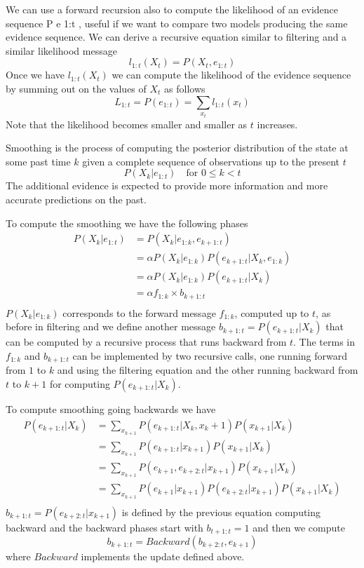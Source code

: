 We can use a forward recursion also to compute the likelihood of an evidence sequence
P e 1:t , useful if we want to compare two models producing the same evidence sequence.\newline
We can derive a recursive equation similar to filtering and a similar likelihood message
\[ l_{1:t}(X_t) = P(X_t, e_{1:t}) \]
Once we have $l_{1:t}(X_t)$ we can compute the likelihood of the evidence sequence by
summing out on the values of $X_t$ as follows
\[ L_{1:t} = P(e_{1:t}) = \sum _{x_t} l_{1:t}(x_t) \]
Note that the likelihood becomes smaller and smaller as $t$ increases.

Smoothing is the process of computing the posterior distribution of the state at some
past time $k$ given a complete sequence of observations up to the present $t$
\[ P(X_k | e_{1:t}) \quad \text{for } 0 \leq k < t \]
The additional evidence is expected to provide more information and more accurate
predictions on the past.

To compute the smoothing we have the following phases
\begin{align*}
   P(X_k | e_{1:t}) & = P(X_k | e_{1:k}, e_{k+1:t}) \\
	            & = \alpha P(X_k | e_{1:k}) P(e_{k+1:t} | X_k, e_{1:k}) \\
		    & = \alpha P(X_k | e_{1:k}) P(e_{k+1:t} | X_k) \\
		    & = \alpha f_{1:k} \times b_{k+1:t} \\
\end{align*}
$P(X_k|e_{1:k})$ corresponds to the forward message $f_{1:k}$, computed up to $t$,
as before in filtering and we define another message $b_{k+1:t} = P(e_{k+1:t}|X_k)$ 
that can be computed by a recursive process that runs backward from $t$.\newline
The terms in $f_{1:k}$ and $b_{k+1:t}$ can be implemented by two recursive calls,
one running forward from $1$ to $k$ and using the filtering equation and 
the other running backward from $t$ to $k+1$ for computing $P(e_{k+1:t}|X_k)$.

To compute smoothing going backwards we have 
\begin{align*}
   P(e_{k+1:t} | X_k) & = \sum _{x_{k+1}} P(e_{k+1:t}|X_k, x_k+1) P(x_{k+1}|X_k) \\
	              & = \sum _{x_{k+1}} P(e_{k+1:t}|x_{k+1}) P(x_{k+1}|X_k) \\
		      & = \sum _{x_{k+1}} P(e_{k+1}, e_{k+2:t} | x_{k+1}) P(x_{k+1} | X_k) \\
		      & = \sum _{x_{k+1}} P(e_{k+1} | x_{k+1}) P(e_{k+2:t} | x_{k+1})
		                          P(x_{k+1} | X_k) \\
\end{align*}
$b_{k+1:t} = P(e_{k+2:t}|x_{k+1})$ is defined by the previous equation computing backward
and the backward phases start with $b_{t+1:t} = 1$ and then we compute 
\[ b_{k+1:t} = Backward(b_{k+2:t}, e_{k+1}) \]
where $Backward$ implements the update defined above.

